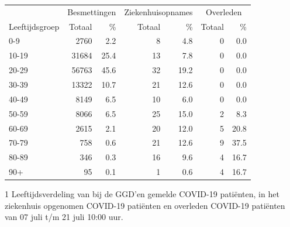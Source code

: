 \documentclass[
  english,
  man,floatsintext]{apa6}
\begin{document}
\begin{table}
\centering\begingroup\fontsize{11}{13}\selectfont

\begin{threeparttable}
\begin{tabular}{lrrrrrr}
\toprule
\multicolumn{1}{c}{ } & \multicolumn{2}{c}{Besmettingen} & \multicolumn{2}{c}{Ziekenhuisopnames} & \multicolumn{2}{c}{Overleden} \\
\cmidrule(l{3pt}r{3pt}){2-3} \cmidrule(l{3pt}r{3pt}){4-5} \cmidrule(l{3pt}r{3pt}){6-7}
Leeftijdsgroep & Totaal & \% & Totaal & \% & Totaal & \%\\
\midrule
0-9 & 2760 & 2.2 & 8 & 4.8 & 0 & 0.0\\
10-19 & 31684 & 25.4 & 13 & 7.8 & 0 & 0.0\\
20-29 & 56763 & 45.6 & 32 & 19.2 & 0 & 0.0\\
30-39 & 13322 & 10.7 & 21 & 12.6 & 0 & 0.0\\
40-49 & 8149 & 6.5 & 10 & 6.0 & 0 & 0.0\\
50-59 & 8066 & 6.5 & 25 & 15.0 & 2 & 8.3\\
60-69 & 2615 & 2.1 & 20 & 12.0 & 5 & 20.8\\
70-79 & 758 & 0.6 & 21 & 12.6 & 9 & 37.5\\
80-89 & 346 & 0.3 & 16 & 9.6 & 4 & 16.7\\
90+ & 95 & 0.1 & 1 & 0.6 & 4 & 16.7\\
\bottomrule
\end{tabular}
\begin{tablenotes}
\item[1] Leeftijdsverdeling van bij de GGD’en gemelde COVID-19 patiënten, in het ziekenhuis opgenomen COVID-19 patiënten en overleden COVID-19 patiënten van 07 juli t/m 21 juli 10:00 uur.
\end{tablenotes}
\end{threeparttable}
\endgroup{}
\end{table}

\newpage
\end{document}
